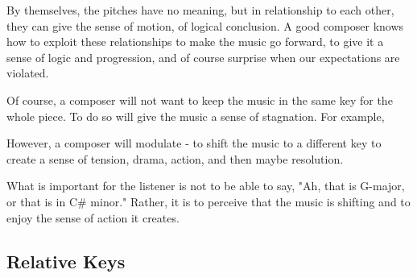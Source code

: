 By themselves, the pitches have no meaning, but in relationship to each other, they can give the sense of motion, of logical conclusion. A good composer knows how to exploit these relationships to make the music go forward, to give it a sense of logic and progression, and of course surprise when our expectations are violated.

Of course, a composer will not want to keep the music in the same key for the whole piece. To do so will give the music a sense of stagnation. For example, 

However, a composer will modulate - to shift the music to a different key to create a sense of tension, drama, action, and then maybe resolution.

What is important for the listener is not to be able to say, "Ah, that is G-major, or that is in C# minor." Rather, it is to perceive that the music is shifting and to enjoy the sense of action it creates.

\subsection{Relative Keys}

